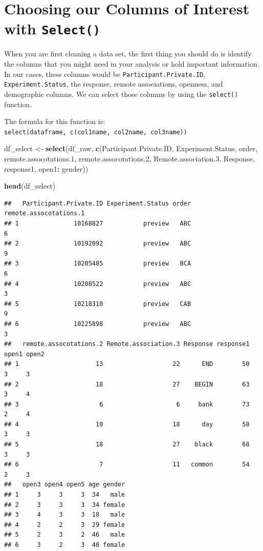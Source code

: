 \documentclass[
]{book}
\newenvironment{Shaded}{\begin{snugshade}}{\end{snugshade}}
\newcommand{\FloatTok}[1]{\textcolor[rgb]{0.00,0.00,0.81}{#1}}
\newcommand{\FunctionTok}[1]{\textcolor[rgb]{0.13,0.29,0.53}{\textbf{#1}}}
\newcommand{\NormalTok}[1]{#1}
\newcommand{\OtherTok}[1]{\textcolor[rgb]{0.56,0.35,0.01}{#1}}
\newcommand{\SpecialCharTok}[1]{\textcolor[rgb]{0.81,0.36,0.00}{\textbf{#1}}}
\begin{document}
\hypertarget{choosing-our-columns-of-interest-with-select}{%
\section{\texorpdfstring{Choosing our Columns of Interest with \texttt{Select()}}{Choosing our Columns of Interest with Select()}}\label{choosing-our-columns-of-interest-with-select}}

When you are first cleaning a data set, the first thing you should do is identify the columns that you might need in your analysis or hold important information. In our cases, these columns would be \texttt{Participant.Private.ID}, \texttt{Experiment.Status}, the response, remote associations, openness, and demographic columns. We can select those columns by using the \texttt{select()} function.

The formula for this function is: \texttt{select(dataframe,\ c(col1name,\ col2name,\ col3name))}

\begin{Shaded}
\begin{Highlighting}[]
\NormalTok{df\_select }\OtherTok{\textless{}{-}} \FunctionTok{select}\NormalTok{(df\_raw, }\FunctionTok{c}\NormalTok{(Participant.Private.ID, Experiment.Status, order,}
\NormalTok{                              remote.assocotations}\FloatTok{.1}\NormalTok{, remote.assocotations}\FloatTok{.2}\NormalTok{,   Remote.association}\FloatTok{.3}\NormalTok{, Response, response1, open1}\SpecialCharTok{:}\NormalTok{ gender))}

\FunctionTok{head}\NormalTok{(df\_select)}
\end{Highlighting}
\end{Shaded}

\begin{verbatim}
##   Participant.Private.ID Experiment.Status order remote.assocotations.1
## 1               10168827           preview   ABC                      6
## 2               10192092           preview   ABC                      9
## 3               10205485           preview   BCA                      6
## 4               10208522           preview   ABC                      3
## 5               10218310           preview   CAB                      9
## 6               10225898           preview   ABC                      3
##   remote.assocotations.2 Remote.association.3 Response response1 open1 open2
## 1                     13                   22      END        50     3     3
## 2                     18                   27    BEGIN        63     3     4
## 3                      6                    6     bank        73     2     4
## 4                     10                   18      day        58     3     3
## 5                     18                   27    black        68     3     3
## 6                      7                   11   common        54     2     3
##   open3 open4 open5 age gender
## 1     3     3     3  34   male
## 2     3     3     3  34 female
## 3     4     3     3  18   male
## 4     2     2     3  29 female
## 5     2     3     2  46   male
## 6     3     2     3  40 female
\end{verbatim}
\end{document}
